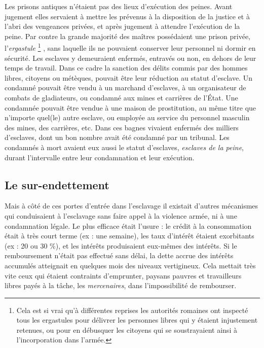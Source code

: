Les prisons antiques n'étaient pas des lieux d'exécution des peines.
Avant jugement elles servaient à mettre les prévenus à la disposition de la
justice et à l'abri des vengeances privées, et après jugement à attendre
l'exécution de la peine. Par contre la grande majorité des maîtres possédaient
une prison privée, l'\emph{ergastule}%
\footnote{Cela est si vrai qu'à différentes reprises les autorités romaines ont inspecté tous les ergastules pour délivrer les personnes libres qui y étaient injustement retenues, ou pour en débusquer les citoyens qui se soustrayaient ainsi à l'incorporation dans l'armée.}%
, sans laquelle ils ne pouvaient
conserver leur personnel ni dormir en sécurité. Les esclaves y demeuraient
enfermés, entravés ou non, en dehors de leur temps de travail.
Dans ce cadre la sanction des délits commis par des hommes libres, citoyens
ou métèques, pouvait être leur réduction au statut d'esclave. Un
condamné pouvait être vendu à un marchand d'esclaves, à un organisateur
de combats de gladiateurs, ou condamné aux mines et carrières de
l'État. Une condamnée pouvait être vendue à une maison de prostitution,
au même titre que n'importe quel(le) autre esclave, ou employée au
service du personnel masculin des mines, des carrières, etc. Dans ces bagnes
vivaient enfermés des milliers d'esclaves, dont un bon nombre avait
été condamné par un tribunal. Les condamnés à mort avaient eux aussi le
statut d'esclaves, {\emph{esclaves de la peine}}, durant l'intervalle entre leur
condamnation et leur exécution.

\subsection{Le sur-endettement}

Mais à côté de ces portes d'entrée dans l'esclavage il existait
d'autres mécanismes qui conduisaient à l'esclavage sans faire appel à la
violence armée, ni à une condamnation légale. Le plus efficace était
l'usure : le crédit à la consommation était à très court terme (ex : une semaine),
les taux d'intérêt étaient exorbitants (ex : 20 ou 30 \%), et les intérêts
produisaient eux-mêmes des intérêts. Si le remboursement n'était pas
effectué sans délai, la dette accrue des intérêts accumulés atteignait en
quelques mois des niveaux vertigineux. Cela mettait très vite ceux qui
étaient contraints d'emprunter, paysans pauvres et travailleurs libres
payés à la tâche, les \emph{mercenaires}, dans l'impossibilité de rembourser.


